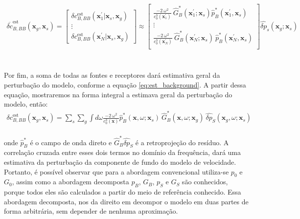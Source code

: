 \begin{eqnarray}
\nonumber
 \overline{\delta c}^{\text{est}}_{B,BB}(\mathbf{x}_{g},\mathbf{x}_{s}) =
 \begin{bmatrix}
     \delta c^{\text{est}}_{B,BB}(\mathbf{x}^{\prime}_{1}|\mathbf{x}_{s},\mathbf{x}_{g}) \\
     \vdots \\
     \delta c^{\text{est}}_{B,BB}(\mathbf{x}^{\prime}_{N}|\mathbf{x}_{s},\mathbf{x}_{g})
 \end{bmatrix}
 \approx
 \begin{bmatrix}
      \frac{-2~\omega^{2}}{c_{0}^{3}(\mathbf{x}_{1}^{\prime})}~ \hat{G}^{*}_{B}(\mathbf{x}_{1}^{\prime};\mathbf{x}_{s}) \hat{p}^{*}_{B}(\mathbf{x}_{1}^{\prime},\mathbf{x}_{s}) \\
          \vdots \\
           \frac{-2~\omega^{2}}{c_{0}^{3}(\mathbf{x}_{N}^{\prime})}~ \hat{G}^{*}_{B}(\mathbf{x}_{N}^{\prime}; \mathbf{x}_{s}) ~\hat{p}^{*}_{B}(\mathbf{x}_{N}^{\prime},\mathbf{x}_{s}) \\
 \end{bmatrix}
 \hat{\delta p}_{s}(\mathbf{x}_{g};\mathbf{x}_{s})
\end{eqnarray}
\begin{eqnarray}
  \label{eq:est_background}
\end{eqnarray}

\\

Por fim, a soma de todas as fontes e receptores dará estimativa geral da perturbação do modelo, conforme a equação \ref{eq:est_background}. A partir dessa equação, mostraremos na forma integral a estimava geral da perturbação do modelo, então:
\begin{eqnarray}
 {\delta c}^{\text{est}}_{B,BB}(\mathbf{x}_{g},\mathbf{x}_{s}) = \sum_{s} \sum_{g} \int d\omega \frac{-2~\omega^{2}}{c_{0}^{3}(\mathbf{x})} \hat{p}_{B}^{*} (\mathbf{x},\omega;\mathbf{x}_{s})~\hat{G}_{B}^{*}(\mathbf{x},\omega;\mathbf{x}_{g})~\hat{\delta p}_{S}(\mathbf{x}_{g},\omega;\mathbf{x}_{s})
\end{eqnarray}
\\
onde $\hat{p}_{B}^{*}$ é o campo de onda direto e $\hat{G}_{B}^{*} \hat{\delta p}_{S}$ é a retroprojeção do resíduo. A correlação cruzada entre esses dois termos no domínio da frequência, dará uma estimativa da perturbação da componente de fundo do modelo de velocidade. Portanto, é possível observar que para a abordagem convencional utiliza-se $p_{0}$ e $G_{0}$, assim como a abordagem decomposta $p_{B}$, $G_{B}$, $p_{S}$ e $G_{S}$ são conhecidos, porque todos eles são calculados a partir do meio de referência conhecido. Essa abordagem decomposta, nos da direito em decompor o modelo em duas partes de forma arbitrária, sem depender de nenhuma aproximação.

